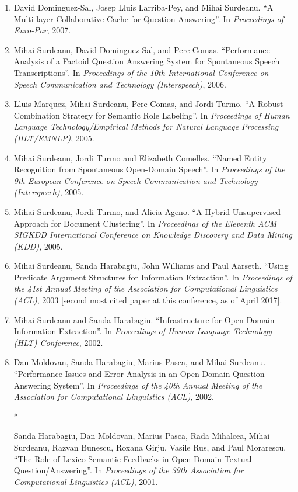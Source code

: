 \documentclass[10pt]{article}
\newcommand{\ve}[1]{{\em #1}} %
\newcommand{\ti}[1]{``#1''} %
\begin{document}
\begin{description}
\begin{enumerate}
\item
David Dominguez-Sal, Josep Lluis Larriba-Pey, and Mihai Surdeanu.  \ti{A Multi-layer Collaborative Cache for Question Answering}.  In \ve{Proceedings of Euro-Par}, 2007.

\item
Mihai Surdeanu, David Dominguez-Sal, and Pere Comas.  \ti{Performance Analysis of a Factoid Question Answering System for Spontaneous Speech Transcriptions}.  In \ve{Proceedings of the 10th International Conference on Speech Communication and Technology (Interspeech)}, 2006.

\item
Lluis Marquez, Mihai Surdeanu, Pere Comas, and Jordi Turmo.  \ti{A Robust Combination Strategy for Semantic Role Labeling}.  In \ve{Proceedings of Human Language Technology/Empirical Methods for Natural Language Processing (HLT/EMNLP)}, 2005.

\item
Mihai Surdeanu, Jordi Turmo and Elizabeth Comelles.  \ti{Named Entity Recognition from Spontaneous Open-Domain Speech}.  In \ve{Proceedings of the 9th European Conference on Speech Communication and Technology (Interspeech)}, 2005.

\item
Mihai Surdeanu, Jordi Turmo, and Alicia Ageno.  \ti{A Hybrid Unsupervised Approach for Document Clustering}.  In \ve{Proceedings of the Eleventh ACM SIGKDD International Conference on Knowledge Discovery and Data Mining (KDD)}, 2005.

\item
Mihai Surdeanu, Sanda Harabagiu, John Williams and Paul Aarseth.  \ti{Using Predicate Argument Structures for Information Extraction}.  In \ve{Proceedings of the 41st Annual Meeting of the Association for Computational Linguistics (ACL)}, 2003 [second most cited paper at this conference, as of April 2017]. 

\item
Mihai Surdeanu and Sanda Harabagiu.  \ti{Infrastructure for Open-Domain Information Extraction}.  In \ve{Proceedings of Human Language Technology (HLT) Conference}, 2002.

\item
Dan Moldovan, Sanda Harabagiu, Marius Pasca, and Mihai Surdeanu.  \ti{Performance Issues and Error Analysis in an Open-Domain Question Answering System}.  In \ve{Proceedings of the 40th Annual Meeting of the Association for Computational Linguistics (ACL)}, 2002.

\item
[* \addtocounter{enumi}{1}\theenumi ]
Sanda Harabagiu, Dan Moldovan, Marius Pasca, Rada Mihalcea, Mihai Surdeanu, Razvan Bunescu, Roxana Girju, Vasile Rus, and Paul Morarescu.  \ti{The Role of Lexico-Semantic Feedbacks in Open-Domain Textual Question/Answering}.  In \ve{Proceedings of the 39th Association for Computational Linguistics (ACL)}, 2001. 


\end{enumerate}
\end{description}
\end{document}
